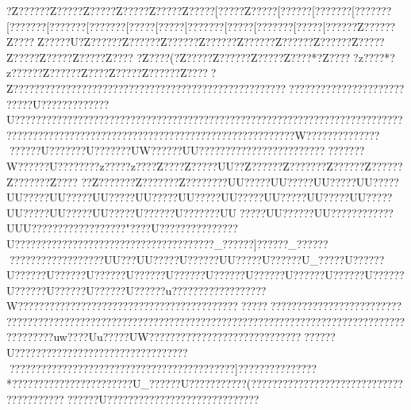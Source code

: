 {{{{{{{{{{{{{{{{{{{{{{{{{{{{{{{{{{{{{{{{{{{{{{{{{{{{{{{{{{{{{{{{{{{{{{{{{{{{{{{{{{{{{{{{{{{{{{{{{{{{{{{{{{{{{{{{{{{{{{{{{{{{{{{{{{{{{{{{{{{{{{{{{{{{{{{{{{{{{{{{{{{{{{{{{{{{{{{{{{{{{{{{{{{{{{{{{{{{{{{{{{{{{{{{{{{{{{{{{{{{{{{{{{{{{{{{{{{{{{{{{{{{{{{{{{{{{{{{{{{{{{{{{{{{{{{{{{{{{{{{{{{{{{{{{{{{{{{{{{{{{{{{{{{{{{{{{{{{{{{{{{{{{{{{{{{{{{{{{{{{{{{{{{{{{{{{{{{{{{{{{{{{{{{{{{{{{{{{{{{{{{{{{{{{{{{{{{{{{{{{{{{{{{{{{{{{{{{{{{{{{{{{{{{{{{{{{{{{{{{{{{{{{{{{{{{{{{{{{{{{{{{{{{{{{{{{{{{{{{{{{{{{{{{{{{{{{{{{{{{{{{{{{{{{{{{{{{{{{{{{{{{{{{{{{{{{{{{{{{{{{{{{{{{{{{{{{{{{{{{{{{{{{{{{{{{{{{{{{{{{{{{{{{{{{{{{{{{{{{{{{{{{{{{{{{{{{{{{{{{{{{{{{{{{{{{{{{{{{{{{{{{{{{{{{{{{{{{{{{{{{{{{{{{{{{{?Z?????{?Z???? {?Z???? {?Z???? {?Z???? {?Z???? {?[???? {?Z???? {?[???? ??[???????[???????[???????[???????[???????[?????[?????[???????[?????[???????[?????[?????{?Z?????{?Z????Z?{????U{?Z?????{?Z?????{?Z?????{?Z?????{?Z?????{?Z?????{?Z?????{?Z???? {?Z???? {?Z???? {?Z???? {?Z???? {?Z????({?Z???? {?Z?????{?Z???? {?Z????*{?Z????{?z????*{?z?????{?Z?????{?Z???{?Z???? {?Z?????{?Z????{?Z???? ????????????????????????????????????????????????????????????? ??????????? ???U?????????????U????????????????  ?????  ?????  ?????  ????   ?????? ?????? ????   ??????????????????  ?????? ?????? ???? ????????????????????????????????????????????W????????????????????U???????U???????UW??????UU????{??  ??{???????{????????????????W?????{?U???{???  ??z???  ??z??  ??Z???? Z?????UU??Z???? ??Z???????Z?????{?Z???? ??Z???????Z????
??Z???????Z???????Z???????{?UU????{?UU????{?UU????{?UU????{?UU????{?UU????{?UU????{?UU????{?UU????{?UU????{?UU????{?UU????{?UU????{?UU????{?UU????{?UU????{?U?????{?U???????UU?????UU??????UU????{???? ????UUU???{???? ??{???? ??{???" ????U???????????????U?????????????{?????{???????{?????{???????{?_?????{?]?????{?_?????{?? ???{???????{??? ???{?UU??{?UU????{?U?????{?UU????{?U?????{?U_????{?U?????{?U?????{?U?????{?U?????{?U?????{?U?????{?U?????{?U?????{?U?????{?U?????{?U?????{?U?????{?U?????{?U?????{?U?????{?u?????{?}?????{??????{?W?????{????????????????????????????????????????????????????????????????????????????????????????????????????????????????????????????????????????????????????????uw????Uu?????UW??????   ?????  ????  ????? ????? ????  ??????U??????? ?????????????????????????????????????????????????????????????????????]???????????????*???????????????????????U_??????U?????{??   ??{??(  ??{???  ??{???? ??{???? ??{???? ??{???? ??{?????{????{??????U??{???? ??{?? ??{?????{?????{?????{??
}}}}}}}}}}}}}}}}}}}}}}}}}}}}}}}}}}}}}}}}}}}}}}}}}}}}}}}}}}}}}}}}}}}}}}}}}}}}}}}}}}}}}}}}}}}}}}}}}}}}}}}}}}}}}}}}}}}}}}}}}}}}}}}}}}}}}}}}}}}}}}}}}}}}}}}}}}}}}}}}}}}}}}}}}}}}}}}}}}}}}}}}}}}}}}}}}}}}}}}}}}}}}}}}}}}}}}}}}}}}}}}}}}}}}}}}}}}}}}}}}}}}}}}}}}}}}}}}}}}}}}}}}}}}}}}}}}}}}}}}}}}}}}}}}}}}}}}}}}}}}}}}}}}}}}}}}}}}}}}}}}}}}}}}}}}}}}}}}}}}}}}}}}}}}}}}}}}}}}}}}}}}}}}}}}}}}}}}}}}}}}}}}}}}}}}}}}}}}}}}}}}}}}}}}}}}}}}}}}}}}}}}}}}}}}}}}}}}}}}}}}}}}}}}}}}}}}}}}}}}}}}}}}}}}}}}}}}}}}}}}}}}}}}}}}}}}}}}}}}}}}}}}}}}}}}}}}}}}}}}}}}}}}}}}}}}}}}}}}}}}}}}}}}}}}}}}}}}}}}}}}}}}}}}}}}}}}}}}}}}}}}}}}}}}}}}}}}}}}}}}}}}}}}}}}}}}}}}}}}}}}}}}}}}}}}}}}}}}}}}}}}}}}}}}}}}}}}}}}}}}}}}}}}}}}}}}}}}}}}}}}}}}}}}}}}}}}}}}}}}}}}}}}}}}}}}}}}}}}}}}}}}}}}}}}}}}}}}}}}}}}}}}}}}}}}}}}}}}}}}}}}}}}}}}}}}}}}}}}}}}}}}}}}
